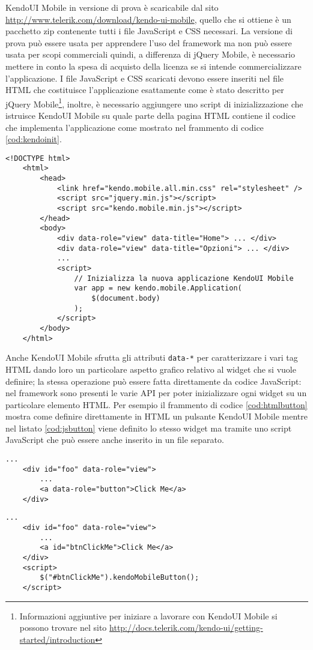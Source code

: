 			KendoUI Mobile in versione di prova è scaricabile dal sito 
			\url{http://www.telerik.com/download/kendo-ui-mobile}, quello che si 
			ottiene è un pacchetto zip contenente tutti i file JavaScript e CSS 
			necessari. La versione di prova	può essere usata per apprendere
			l'uso del framework ma non può essere usata per scopi commerciali 
			quindi, a differenza di jQuery Mobile, è necessario	mettere in conto
			la spesa di acquisto della licenza se si intende commercializzare
			l'applicazione.	I file JavaScript e CSS scaricati devono essere
			inseriti nel file HTML che costituisce l'applicazione esattamente
			come è stato descritto per jQuery Mobile\footnote{Informazioni
			aggiuntive per iniziare a lavorare con KendoUI Mobile si possono
			trovare nel sito \url{http://docs.telerik.com/kendo-ui/getting-started/introduction}},
			inoltre, è necessario aggiungere uno script di inizializzazione che
			istruisce KendoUI Mobile su quale parte della pagina HTML contiene il
			codice che implementa l'applicazione come mostrato nel frammento di
			codice \ref{cod:kendoinit}.
			\begin{lstlisting}[label={cod:kendoinit},caption={Esempio di inizializzazione di un'applicazione KendoUI Mobile}]
	<!DOCTYPE html>
	<html>
		<head>
			<link href="kendo.mobile.all.min.css" rel="stylesheet" />
			<script src="jquery.min.js"></script>
			<script src="kendo.mobile.min.js"></script>
		</head>
		<body>
			<div data-role="view" data-title="Home"> ... </div>
			<div data-role="view" data-title="Opzioni"> ... </div>
			...
			<script>
				// Inizializza la nuova applicazione KendoUI Mobile
				var app = new kendo.mobile.Application(
					$(document.body)
				);
			</script>
		</body>
	</html>
			\end{lstlisting} 
			Anche KendoUI Mobile sfrutta gli attributi \verb|data-*| per
			caratterizzare i vari tag HTML dando loro un particolare aspetto
			grafico relativo al widget che si vuole definire; la stessa
			operazione può essere fatta direttamente da codice JavaScript: nel
			framework sono presenti le varie API per poter inizializzare ogni
			widget su un particolare elemento HTML. Per esempio il frammento di
			codice \ref{cod:htmlbutton} mostra come definire direttamente in
			HTML un pulsante KendoUI Mobile mentre nel listato \ref{cod:jsbutton}
			viene definito lo stesso widget ma tramite uno script JavaScript che
			può essere anche inserito in un file separato.
			\begin{lstlisting}[caption={Definizione di un bottone KendoUI Mobile in HTML tramite attributo data-*.},label={cod:htmlbutton}]
	...
	<div id="foo" data-role="view">
		...
		<a data-role="button">Click Me</a>
	</div>
			\end{lstlisting}
			\begin{lstlisting}[caption={Definizione di un bottone KendoUI Mobile in JavaScript tramite l'uso delle apposite API.},label={cod:jsbutton}]
	...
	<div id="foo" data-role="view">
		...
		<a id="btnClickMe">Click Me</a>
	</div>
	<script>
		$("#btnClickMe").kendoMobileButton();
	</script>
			\end{lstlisting}
			
